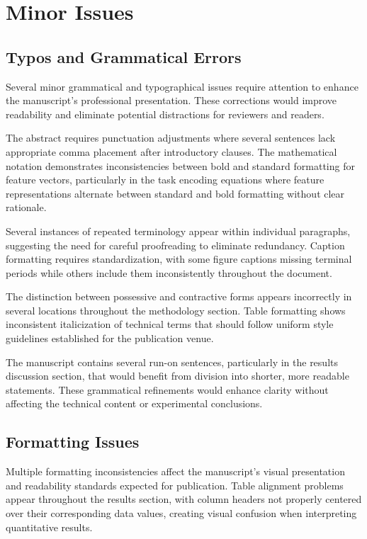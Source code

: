 \section*{Minor Issues}
\label{sec:minor_issues}

\subsection*{Typos and Grammatical Errors}
Several minor grammatical and typographical issues require attention to enhance the manuscript's professional presentation. These corrections would improve readability and eliminate potential distractions for reviewers and readers.

The abstract requires punctuation adjustments where several sentences lack appropriate comma placement after introductory clauses. The mathematical notation demonstrates inconsistencies between bold and standard formatting for feature vectors, particularly in the task encoding equations where feature representations alternate between standard and bold formatting without clear rationale.

Several instances of repeated terminology appear within individual paragraphs, suggesting the need for careful proofreading to eliminate redundancy. Caption formatting requires standardization, with some figure captions missing terminal periods while others include them inconsistently throughout the document.

The distinction between possessive and contractive forms appears incorrectly in several locations throughout the methodology section. Table formatting shows inconsistent italicization of technical terms that should follow uniform style guidelines established for the publication venue.

The manuscript contains several run-on sentences, particularly in the results discussion section, that would benefit from division into shorter, more readable statements. These grammatical refinements would enhance clarity without affecting the technical content or experimental conclusions.

\subsection*{Formatting Issues}
Multiple formatting inconsistencies affect the manuscript's visual presentation and readability standards expected for publication. Table alignment problems appear throughout the results section, with column headers not properly centered over their corresponding data values, creating visual confusion when interpreting quantitative results.

